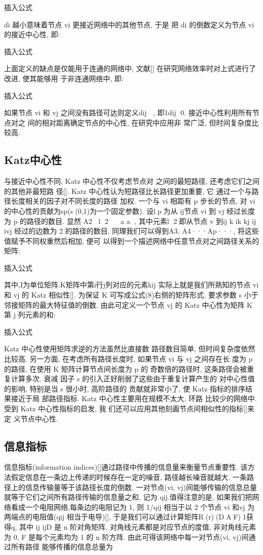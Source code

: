 			插入公式

			di 越小意味着节点 vi 更接近网络中的其他节点, 于是 把 di 的倒数定义为节点 vi 的接近中心性, 即:

			插入公式

			上面定义的缺点是仅能用于连通的网络中, 文献[] 在研究网络效率时对上式进行了改进, 使其能够用 于非连通网络中, 即:

			插入公式

			如果节点 vi 和 vj 之间没有路径可达则定义dij , 即1dij 0. 接近中心性利用所有节点对之 间的相对距离确定节点的中心性, 在研究中应用非 常广泛, 但时间复杂度比较高.
\subsection{Katz中心性}
与接近中心性不同, Katz 中心性不仅考虑节点对 之间的最短路径, 还考虑它们之间的其他非最短路 径[]. Katz 中心性认为短路径比长路径更加重要, 它 通过一个与路径长度相关的因子对不同长度的路径 加权. 一个与 vi 相距有 p 步长的节点, 对 vi 的中心性的贡献为sp(s(0,1)为一个固定参数). 设lp为从 ij节点 vi 到 vj 经过长度为 p 的路径的数目. 显然 A2 l 2 a a , 其中元素l 2即从节点 v 到ij k ik kj ij ivj 经过的边数为 2 的路径的数目, 同理我们可以得到A3, A4···Ap···, 将这些值赋予不同权重然后相加, 便可 以得到一个描述网络中任意节点对之间路径关系的 矩阵:

			插入公式

			其中,I为单位矩阵.K矩阵中第i行j列对应的元素kij 实际上就是我们所熟知的节点 vi 和 vj 的 Katz 相似性[]. 为保证 K 可写成公式(8)右侧的矩阵形式, 要求参数 s 小于邻接矩阵的最大特征值的倒数. 由此可定义一个节点 vj 的 Katz 中心性为矩阵 K 第 j 列元素的和:

			插入公式

			Katz 中心性使用矩阵求逆的方法虽然比直接数 路径数目简单, 但时间复杂度依然比较高. 另一方面, 在考虑所有路径长度时, 如果节点 vi 与 vj 之间存在长 度为 p 的路径, 在使用 K 矩阵计算节点间长度为 p 的 奇数倍的路径时, 这条路径会被重复计算多次. 衰减 因子 s 的引入正好削弱了这些由于重复计算产生的 对中心性值的影响, 特别是当 s 很小时, 高阶路径的 贡献就非常小了, 使 Katz 指标的排序结果接近于局 部路径指标. Katz 中心性主要用在规模不太大, 环路 比较少的网络中. 受到 Katz 中心性指标的启发, 我 们还可以应用其他刻画节点间相似性的指标[]来定 义节点中心性.
\subsection{信息指标}
信息指标(information indices)[]通过路径中传播的信息量来衡量节点重要性. 该方法假定信息在一条边上传递的时候存在一定的噪音, 路径越长噪音就越大. 一条路径上的信息传输量等于该路径长度的倒数. 一对节点(vi, vj)间能够传输的信息总量就等于它们之间所有路径传输的信息量之和, 记为 qij.值得注意的是, 如果我们把网络看成一个电阻网络,每条边的电阻记为 1, 则 1/qij 相当于以 2 个节点 vi 和vj 为两端点的电阻值(qij 相当于电导)[], 于是我们可以通过计算矩阵R(r)(DAF)1获得q, 其中 ij ijD 是 n 阶对角矩阵, 对角线元素都是对应节点的度值, 非对角线元素为 0, F 是每个元素均为 1 的 n 阶方阵. 由此可得该网络中每一对节点(vi, vj)间通过所有路径 能够传播的信息总量为

